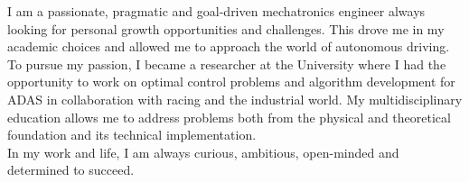 \documentclass[9pt]{developercv} %
\begin{document}
\begin{minipage}[t]{0.52\textwidth} %
	\vspace{-\baselineskip} %
%
I am a passionate, pragmatic and goal-driven mechatronics engineer always looking for personal growth opportunities and challenges. This drove me in my academic choices and allowed me to approach the world of autonomous driving.
To pursue my passion, I became a researcher at the University where I had the opportunity to work on optimal control problems and algorithm development for ADAS in collaboration with racing and the industrial world.
My multidisciplinary education allows me to address problems both from the physical and theoretical foundation and its technical implementation. \\
In my work and life, I am always curious, ambitious, open-minded and determined to succeed.



%
\end{minipage}
\hfill %
\begin{minipage}[t]{0.45\textwidth} %
	\vspace{-\baselineskip} %
	\begin{barchart}{5.5}
	\end{barchart}
\end{minipage}
%
%
%
\end{document}
